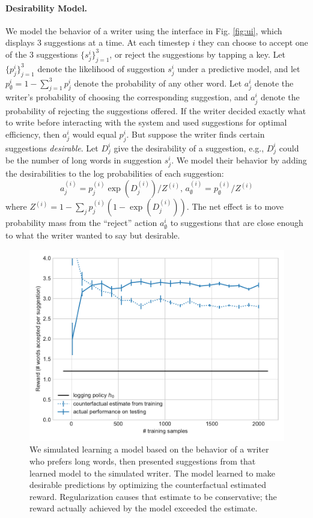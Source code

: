 \documentclass[11pt,letterpaper]{article}
\begin{document}
\paragraph{Desirability Model.}
We model the behavior of a writer using the interface in Fig. \ref{fig:ui}, which displays 3 suggestions at a time. At each timestep $i$ they can choose to accept one of the 3 suggestions $\{s_j^i\}_{j=1}^3$, or reject the suggestions by tapping a key. Let $\{p_j^i\}_{j=1}^3$ denote the likelihood of suggestion $s^i_j$ under a predictive model, and let $p^i_\emptyset=1-\sum_{j=1}^3 p^i_j$ denote the probability of any other word. Let $a^i_j$ denote the writer's probability of choosing the corresponding suggestion, and $a^i_j$ denote the probability of rejecting the suggestions offered. If the writer decided exactly what to write before interacting with the system and used suggestions for optimal efficiency, then $a_j^i$ would equal $p_j^i$. But suppose the writer finds certain suggestions \emph{desirable}. Let $D^i_j$ give the desirability of a suggestion, e.g., $D_j^i$ could be the number of long words in suggestion $s_j^i$. We model their behavior by adding the desirabilities to the log probabilities of each suggestion: $$a_j^{(i)} = p_j^{(i)}\exp({D_j^{(i)}})/Z^{(i)},\,a_\emptyset^{(i)}=p_\emptyset^{(i)}/Z^{(i)}$$  where $Z^{(i)}=1-\sum_j p_j^{(i)}(1-\exp(D_j^{(i)})).$
The net effect is to move probability mass from the ``reject'' action $a^i_\emptyset$ to suggestions that are close enough to what the writer wanted to say but desirable.

%


\begin{figure}[t]
\centering
%
\includegraphics[width=.9\columnwidth]{reward_subsamples_longword}
\caption{\label{fig:sim-longword} We simulated learning a model based on the behavior of a writer who prefers long words, then presented suggestions from that learned model to the simulated writer. The model learned to make desirable predictions by optimizing the counterfactual estimated reward. Regularization causes that estimate to be conservative; the reward actually achieved by the model exceeded the estimate.}
\end{figure}
\end{document}
